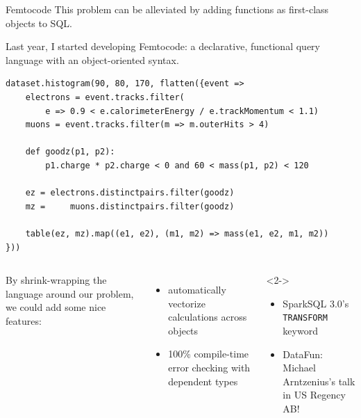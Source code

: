 \documentclass[aspectratio=169]{beamer}
\begin{document}
\begin{frame}[fragile]{Femtocode}
\vspace{0.35 cm}
This problem can be alleviated by adding functions as first-class objects to SQL.

\vspace{0.2 cm}
Last year, I started developing Femtocode: a declarative, functional query language with an object-oriented syntax.

\begin{center}
\small
\begin{lstlisting}[language=femtocode]
dataset.histogram(90, 80, 170, flatten({event =>
    electrons = event.tracks.filter(
        e => 0.9 < e.calorimeterEnergy / e.trackMomentum < 1.1)
    muons = event.tracks.filter(m => m.outerHits > 4)

    def goodz(p1, p2):
        p1.charge * p2.charge < 0 and 60 < mass(p1, p2) < 120

    ez = electrons.distinctpairs.filter(goodz)
    mz =     muons.distinctpairs.filter(goodz)

    table(ez, mz).map((e1, e2), (m1, m2) => mass(e1, e2, m1, m2))
}))
\end{lstlisting}
\end{center}
\end{frame}

\begin{frame}{}
\vspace{1 cm}
\large
\begin{columns}[t]
By shrink-wrapping the language around our problem, we could add some nice features:
\begin{itemize}
\item automatically vectorize calculations across objects
\item 100\% compile-time error checking with dependent types
\end{itemize}

\begin{uncoverenv}<2->
\begin{itemize}
\item SparkSQL 3.0's {\tt\small TRANSFORM} keyword
\item DataFun: Michael Arntzenius's talk in US Regency AB!
\end{itemize}
\end{uncoverenv}


\vspace{0.5 cm}
\end{columns}
\end{frame}
\end{document}
